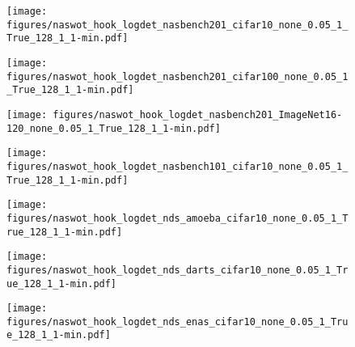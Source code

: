 \documentclass{article}
\begin{document}
\begin{figure*}[!ht]

     \centering
     \begin{subfigure}[b]{0.3\textwidth}
         \centering
         \texttt{[image: figures/naswot\_hook\_logdet\_nasbench201\_cifar10\_none\_0.05\_1\_True\_128\_1\_1-min.pdf]}
         \caption{}
     \end{subfigure}
     \hfill
     \begin{subfigure}[b]{0.3\textwidth}
         \centering
         \texttt{[image: figures/naswot\_hook\_logdet\_nasbench201\_cifar100\_none\_0.05\_1\_True\_128\_1\_1-min.pdf]}
         \caption{}
     \end{subfigure}
     \hfill
     \begin{subfigure}[b]{0.3\textwidth}
         \centering
         \texttt{[image: figures/naswot\_hook\_logdet\_nasbench201\_ImageNet16-120\_none\_0.05\_1\_True\_128\_1\_1-min.pdf]}
         \caption{}
         \label{fig:pnas}
     \end{subfigure}

    \centering
     \begin{subfigure}[b]{0.3\textwidth}
         \centering

         \texttt{[image: figures/naswot\_hook\_logdet\_nasbench101\_cifar10\_none\_0.05\_1\_True\_128\_1\_1-min.pdf]}
         \caption{}
     \end{subfigure}
     \hfill
     \begin{subfigure}[b]{0.3\textwidth}
         \centering

         \texttt{[image: figures/naswot\_hook\_logdet\_nds\_amoeba\_cifar10\_none\_0.05\_1\_True\_128\_1\_1-min.pdf]}
         \caption{}
     \end{subfigure}
     \hfill
     \begin{subfigure}[b]{0.3\textwidth}
         \centering
         \texttt{[image: figures/naswot\_hook\_logdet\_nds\_darts\_cifar10\_none\_0.05\_1\_True\_128\_1\_1-min.pdf]}
         \caption{}
     \end{subfigure}

    
    \centering
     \begin{subfigure}[b]{0.3\textwidth}
         \centering

        \texttt{[image: figures/naswot\_hook\_logdet\_nds\_enas\_cifar10\_none\_0.05\_1\_True\_128\_1\_1-min.pdf]}
         \caption{}
         \label{fig:amoeba}
     \end{subfigure}
     \hfill
          \begin{subfigure}[b]{0.3\textwidth}
         \centering


\end{subfigure}
\end{figure*}
\end{document}
